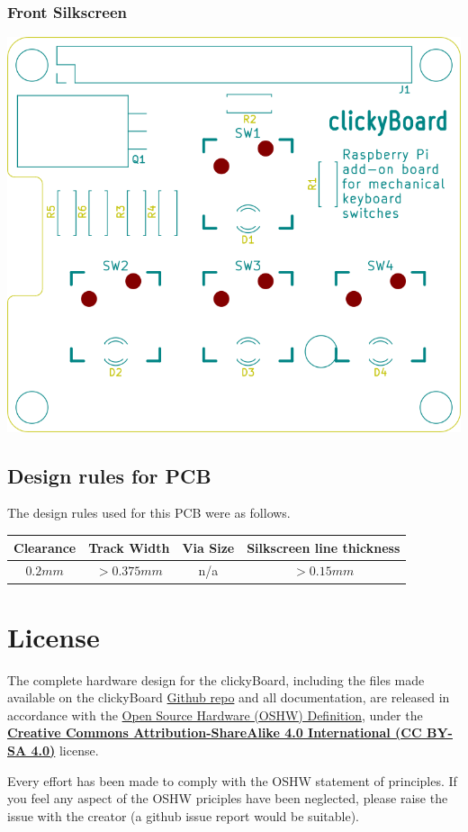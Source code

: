 \documentclass[10pt, a4paper, onesided]{article}
\begin{document}
		\subsubsection*{Front Silkscreen}
		\begin{center}
			\includegraphics[width=0.7\linewidth]{img/F_Ss}
		\end{center}
	
	\subsection{Design rules for PCB}

		The design rules used for this PCB were as follows.
	
		\begin{tabular}{c|c|c|c}
			Clearance & Track Width & Via Size & Silkscreen line thickness \\ 
			\hline 
			$0.2 mm$ & $> 0.375 mm$ & n/a & $> 0.15 mm$ \\ 
		\end{tabular} 

\section{License}

	The complete hardware design for the clickyBoard, including the files made available on the clickyBoard \href{https://github.com/SecretImbecile/clickyBoard}{Github repo} and all documentation, are released in accordance with the \href{https://www.oshwa.org/definition/}{Open Source Hardware (OSHW) Definition}, under the \href{https://creativecommons.org/licenses/by-sa/4.0/}{\textbf{Creative Commons Attribution-ShareAlike 4.0 International (CC BY-SA 4.0)}} license.
	
	Every effort has been made to comply with the OSHW statement of principles. If you feel any aspect of the OSHW priciples have been neglected, please raise the issue with the creator (a github issue report would be suitable).
\end{document}
